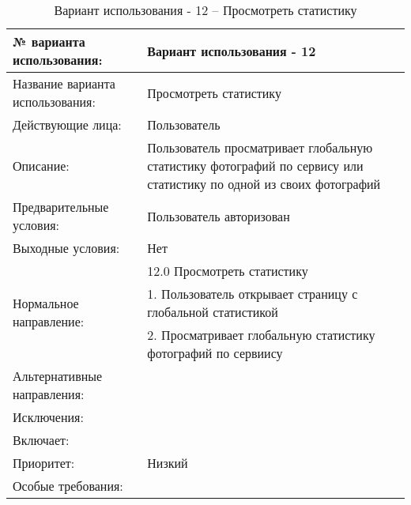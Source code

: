 \begin{table}[H]
  \caption{\onehalfspacing Вариант использования - 12 – Просмотреть статистику}\label{use-case-12-table}
  \begin{tabular}{|p{6cm}|p{10cm}|}
  \hline № варианта использования: & Вариант использования - 12 \\
  \hline Название варианта использования: & Просмотреть статистику \\
  \hline Действующие лица: & Пользователь \\
  \hline Описание: & Пользователь просматривает глобальную статистику фотографий по сервису или статистику по одной из своих фотографий \\
  \hline Предварительные условия: & Пользователь авторизован \\
  \hline Выходные условия: & Нет \\
  \hline \multirow{3}{*}{Нормальное направление:} & 12.0 Просмотреть статистику \\
  \cline{2-2} & 1. Пользователь открывает страницу с глобальной статистикой \\
  \cline{2-2} & 2. Просматривает глобальную статистику фотографий по сервиису \\
  \hline Альтернативные направления: &  \\
  \hline Исключения: &  \\
  \hline Включает: &  \\
  \hline Приоритет: & Низкий \\
  \hline Особые требования: &  \\
  \hline 
  \end{tabular}
\end{table}

